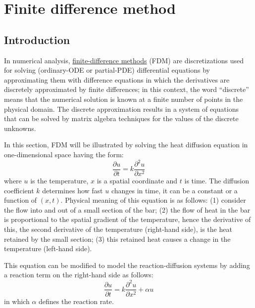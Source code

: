 \section{Finite difference method}
\subsection{Introduction}
In numerical analysis, \href{https://en.wikipedia.org/wiki/Finite_difference_method}{finite-difference methods} (FDM) are discretizations used for solving (ordinary-ODE or partial-PDE) differential equations by approximating them with difference equations in which the derivatives are discretely approximated by finite differences; in this context, the word ``discrete'' means that the numerical solution is known at a finite number of points in the physical domain. The discrete approximation results in a system of equations that can be solved by matrix algebra techniques for the values of the discrete unknowns.

In this section, FDM will be illustrated by solving the heat diffusion equation in one-dimensional space having the form:
\begin{equation}
    \frac{\partial u}{\partial t} = k \frac{\partial^2 u}{\partial x^2}
    \nonumber
\end{equation}
where $u$ is the temperature, $x$ is a spatial coordinate and $t$ is time. The diffusion coefficient $k$ determines how fast $u$ changes in time, it can be a constant or a function of $(x,t)$. Physical meaning of this equation is as follows: (1) consider the flow into and out of a small section of the bar; (2) the flow of heat in the bar is proportional to the spatial gradient of the temperature, hence the derivative of this, the second derivative of the temperature (right-hand side), is the heat retained by the small section; (3) this retained heat causes a change in the temperature (left-hand side).

This equation can be modified to model the reaction-diffusion systems by adding a reaction term on the right-hand side as follows:
\begin{equation}
    \frac{\partial u}{\partial t} = k \frac{\partial^2 u}{\partial x^2} + \alpha u
    \nonumber
\end{equation}
in which $\alpha$ defines the reaction rate. 




